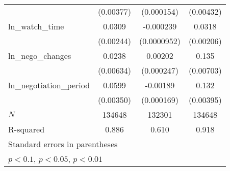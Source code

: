 {\begin{tabular}{l*{3}{c}}
            &   (0.00377)         &  (0.000154)         &   (0.00432)         \\
\addlinespace
ln\_watch\_time&      0.0309\sym{***}&   -0.000239\sym{**} &      0.0318\sym{***}\\
            &   (0.00244)         & (0.0000952)         &   (0.00206)         \\
\addlinespace
ln\_nego\_changes&      0.0238\sym{***}&     0.00202\sym{***}&       0.135\sym{***}\\
            &   (0.00634)         &  (0.000247)         &   (0.00703)         \\
\addlinespace
ln\_negotiation\_period&      0.0599\sym{***}&    -0.00189\sym{***}&       0.132\sym{***}\\
            &   (0.00350)         &  (0.000169)         &   (0.00395)         \\
\midrule
\(N\)       &      134648         &      132301         &      134648         \\
R-squared   &       0.886         &       0.610         &       0.918         \\
\bottomrule
\multicolumn{4}{l}{\footnotesize Standard errors in parentheses}\\
\multicolumn{4}{l}{\footnotesize \sym{*} \(p<0.1\), \sym{**} \(p<0.05\), \sym{***} \(p<0.01\)}\\
\end{tabular}
}
